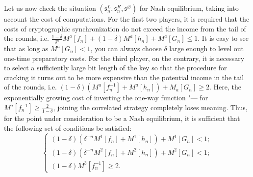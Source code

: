 Let us now check the situation $(\mathfrak{s}^L_n, \mathfrak{s}^R_n, \mathfrak{s}^{\varnothing})$ for Nash equilibrium, taking into account the cost of computations. For the first two players, it is required that the costs of cryptographic synchronization do not exceed the income from the tail of the rounds, i.e. $\frac{1 - \delta}{\delta^n} M^a[f_n] + (1 - \delta) M^a[h_n] + M^a[G_n] \le 1$. It is easy to see that as long as $M^a[G_n] < 1$, you can always choose $\delta$ large enough to level out one-time preparatory costs. For the third player, on the contrary, it is necessary to select a sufficiently large bit length of the key so that the procedure for cracking it turns out to be more expensive than the potential income in the tail of the rounds, i.e. $(1 - \delta) (M^a[f_n^{-1}] + M^a[h_n]) + M_a[G_n] \ge 2$. Here, the exponentially growing cost of inverting the one-way function "--- for $M^a[f_n^{-1}] \ge \frac{2}{1 - \delta}$, joining the correlated strategy completely loses meaning. Thus, for the point under consideration to be a Nash equilibrium, it is sufficient that the following set of conditions be satisfied: %
\begin{equation*}
	\begin{cases}
		(1 - \delta)(\delta^{-n} M^1[f_n] + M^1[h_n]) + M^1[G_n] < 1; \\
		(1 - \delta)(\delta^{-n} M^2[f_n] + M^2[h_n]) + M^2[G_n] < 1; \\
		(1 - \delta) M^3[f_n^{-1}] \ge 2.
	\end{cases}
\end{equation*}

